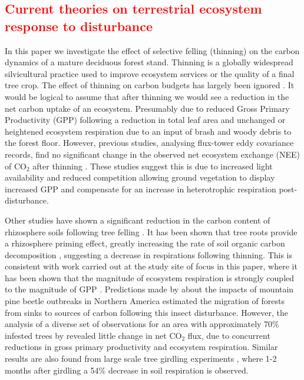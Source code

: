 \documentclass[12pt]{article}
\begin{document}
\subsection{\textcolor{red}{Current theories on terrestrial ecosystem response to disturbance}}
In this paper we investigate the effect of selective felling (thinning) on the carbon dynamics of a mature deciduous forest stand. Thinning is a globally widespread silvicultural practice used to improve ecosystem services or the quality of a final tree crop. The effect of thinning on carbon budgets has largely been ignored \citep{JGRG:JGRG779}. It would be logical to assume that after thinning we would see a reduction in the net carbon uptake of an ecosystem. Presumably due to reduced Gross Primary Productivity (GPP) following a reduction in total leaf area and unchanged or heightened ecosystem respiration due to an input of brash and woody debris to the forest floor. However, previous studies, analysing flux-tower eddy covariance records, find no significant change in the observed net ecosystem exchange (NEE) of CO\(_{2}\) after thinning \citep{vesala2005effect, wilkinson2015effects, moreaux2011paired, dore2012recovery}. These studies suggest this is due to increased light availability and reduced competition allowing ground vegetation to display increased GPP and compensate for an increase in heterotrophic respiration post-disturbance.  

Other studies have shown a significant reduction in the carbon content of rhizosphere soils following tree felling \citep{Hernesmaa2005777}. It has been shown that tree roots provide a rhizosphere priming effect, greatly increasing the rate of soil organic carbon decomposition \citep{ELE:ELE1095}, suggesting a decrease in respirations following thinning. This is consistent with work carried out at the study site of focus in this paper, where it has been shown that the magnitude of ecosystem respiration is strongly coupled to the magnitude of GPP \citep{heinemeyer2012exploring}. Predictions made by \citet{kurz2008mountain} about the impacts of mountain pine beetle outbreaks in Northern America estimated the migration of forests from sinks to sources of carbon following this insect disturbance. However, the analysis of a diverse set of observations for an area with approximately 70\% infested trees by \citet{ELE:ELE12097} revealed little change in net CO\(_{2}\) flux, due to concurrent reductions in gross primary productivity and ecosystem respiration. Similar results are also found from large scale tree girdling experiments \citep{hogberg2001large},  where 1-2 months after girdling a 54\% decrease in soil respiration is observed.
\end{document}
